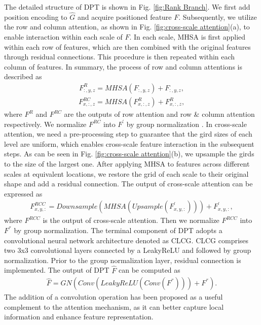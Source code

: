 \documentclass[sigconf]{acmart}
\begin{document}
The detailed structure of DPT is shown in Fig. \ref{fig:Rank Branch}. We first add position encoding to $\hat{G}$ and acquire positioned feature $F$. Subsequently, we utilize the row and column attention, as shown in Fig. \ref{fig:cross-scale attention}(a), to enable interaction within each scale of $F$. In each scale, MHSA is first applied within each row of features, which are then combined with the original features through residual connections. This procedure is then repeated within each column of features. In summary, the process of row and column attentions is described as
  \begin{equation}
 \begin{split}
F^R_{:,y,z} = MHSA(F_{:,y,z}) + F_{:,y,z}, 
 \end{split}
 \end{equation}
  \begin{equation}
 \begin{split}
F^{RC}_{x,:,z} = MHSA(F^R_{x,:,z}) + F^R_{x,:,z},
 \end{split}
 \end{equation} where $F^R$ and $F^{RC}$ are the outputs of row attention and row \& column attention respectively. We normalize $F^{RC}$ into $F^{'}$ by group normalization \cite{wu2018group}. In cross-scale attention, we need a pre-processing step to guarantee that the gird sizes of each level are uniform, which enables cross-scale feature interaction in the subsequent steps. As can be seen in Fig. \ref{fig:cross-scale attention}(b), we upsample the girds to the size of the largest one. After applying MHSA to features across different scales at equivalent locations, we restore the grid of each scale to their original shape and add a residual connection. The output of cross-scale attention can be expressed as
  \begin{equation}
 \begin{split}
F^{RCC}_{x,y,:} = Downsample(MHSA(Upsample(F^{'}_{x,y,:}))) + F^{'}_{x,y,:},
 \end{split}
 \end{equation} where $F^{RCC}$ is the output of cross-scale attention. Then we normalize $F^{RCC}$ into $F^{''}$ by group normalization. The terminal component of DPT adopts a convolutional neural network architecture denoted as CLCG. CLCG comprises two 3x3 convolutional layers connected by a LeakyReLU and followed by group normalization. Prior to the group normalization layer, residual connection is implemented. The output of DPT $\hat{F}$ can be computed as
  \begin{equation}
 \begin{split}
\hat{F} = GN(Conv(LeakyReLU(Conv(F^{''}))) + F^{''}).
 \end{split}
 \end{equation}
The addition of a convolution operation has been proposed as a useful complement to the attention mechanism, as it can better capture local information and enhance feature representation.
\end{document}
